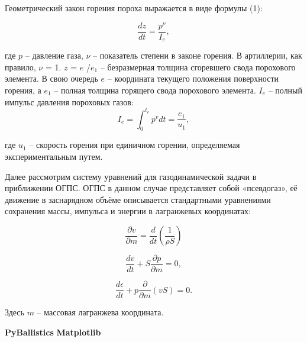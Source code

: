 \documentclass[14pt, a4paper]{report} %
\begin{document}
Геометрический закон горения пороха выражается в виде формулы (1): 

\begin{equation}
\frac{dz}{dt} = \frac{p^\nu}{I_e}, 
\label{eq:1}
\end{equation}

где  $p$ -- давление газа, $\nu$ -- показатель степени
в законе горения. В артиллерии, как правило, $\nu$ = 1. $z$ = $e$ /$e_1$ -- безразмерная толщина сгоревшего свода порохового элемента. В свою очередь
$e$ -- координата текущего положения поверхности горения, а $e_1$ -- полная толщина горящего свода порохового элемента. $I_e$ -- полный импульс давления пороховых газов:
\[
I_e = \int_0^{t_e} p^v  dt = \frac{e_1}{u_1},
\]

где $u_1$ -- скорость горения при единичном горении, определяемая экспериментальным путем.

Далее рассмотрим систему уравнений для газодинамической задачи в приближении ОГПС. ОГПС в данном случае представляет собой «псевдогаз», её движение в заснарядном
объёме описывается стандартными уравнениями сохранения массы, импульса и энергии в лагранжевых координатах: 

\begin{equation}
\frac{\partial v}{\partial m} = \frac{d}{dt}\left(\frac{1}{\rho S}\right)
\end{equation}

\begin{equation}
\frac{dv}{dt} + S\frac{\partial p}{\partial m} = 0,
\end{equation}

\begin{equation}
\frac{d\epsilon}{dt} + p\frac{\partial}{\partial m}(vS) = 0.
\end{equation}

Здесь $m$ -- массовая лагранжева координата.









\newpage
\begin{thebibliography}{9}
\bibitem{} \textbf{PyBallistics}
\bibitem{} \textbf{Matplotlib} 


\end{thebibliography}
\end{document}
